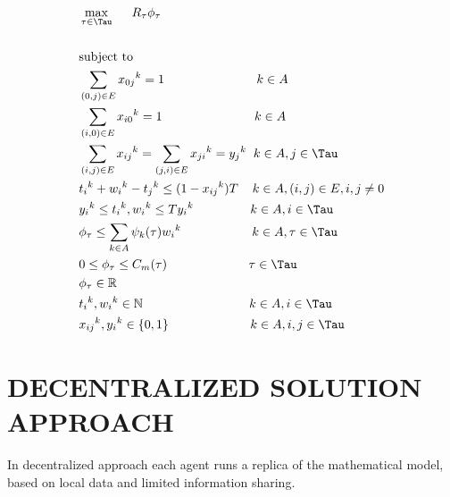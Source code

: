 \documentclass[conference]{IEEEtran}
\begin{document}
\begin{align}
&\displaystyle \max_{\tau \in \Tau}\hspace{0.5cm}R_\tau \phi_\tau \\ \notag\\
&\displaystyle \text{subject to} \notag \\
&\displaystyle \sum_{(0,j) \in E} {x_{0j}}^k  =  1\hspace{2.6cm}  {k \in A}\\ 
&\displaystyle \sum_{(i,0) \in E} {x_{i0}}^k  =  1 \hspace{2.6cm} {k \in A}\\ 
&\displaystyle \sum_{(i,j) \in E} {x_{ij}}^k  = \sum_{(j,i) \in E} {x_{ji}}^k = {y_j}^k \hspace{0.2cm} {k \in A,j \in \Tau}\\ 
&\displaystyle{{t_i}^k}+{{w_i}^k}-{{t_j}^k}\leq{(1-{{x_{ij}}^k})T} \hspace{0.4cm}{k \in A,(i,j) \in E,i,j \ne 0}\\
&{{y_i}^k} \leq {{t_i}^k},{{w_i}^k} \leq T{{y_i}^k}\hspace{1.6cm}  k \in A,i \in \Tau\\
&\phi_{\tau} \leq \sum_{k \in A} {\psi_k}(\tau){{w_i}^k} \hspace{2.0cm} k \in A,\tau \in \Tau\\
& 0 \leq \phi_{\tau} \leq C_{m}(\tau) \hspace{2.3cm} \tau \in \Tau \\
&\phi_{\tau} \in \mathbb{R} \\
&{{t_i}^k},{{w_i}^k} \in \mathbb{N}\hspace{3cm} k \in A,i \in \Tau\\
&{x_{ij}}^k,{y_i}^k \in \{0,1\} \hspace{2.3cm}k \in A,i,j \in \Tau
\end{align}
\section{DECENTRALIZED SOLUTION APPROACH}
In decentralized approach each agent runs a replica of the mathematical model, based on local data and limited information sharing.
\end{document}
